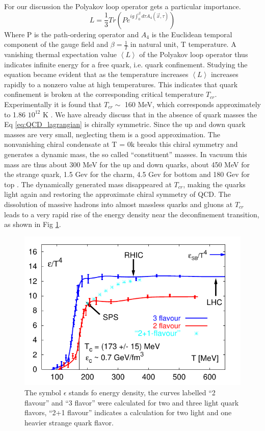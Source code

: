 \documentclass[12pt,a4paper]{book}
\begin{document}
	For our discussion the Polyakov loop operator gets a particular importance. 
	\begin{equation}
		L=\frac{1}{3} Tr \left(P e^{ig \int_{0}^{\beta} d\tau A_4(\vec{x},\tau) } \right)
		\label{eq:Polyakov-loop}
	\end{equation}
	Where P is the path-ordering operator and $A_4$ is the Euclidean temporal component of the gauge field and $\beta= \frac{1}{T}$ in natural unit, T temperature. A vanishing thermal expectation value $\left<L\right>$ of the Polyakov loop operator thus indicates infinite energy for a free quark, i.e. quark confinement. Studying the equation became evident that as the temperature increases $\left<L\right>$ increases rapidly to a nonzero value at high temperatures. This indicates that quark confinement is broken at the corresponding critical temperature $T_{cr}$. Experimentally it is found that $T_{cr} \sim$ 160 MeV, which corresponds approximately to 1.86 $10^12$ K \cite{Herrmann:2920632}. We have already discuss that in the absence of quark masses the Eq \ref{eq:QCD_lagrangian} is chirally symmetric. Since the up and down quark masses are very small, neglecting them is a good approximation. The nonvanishing chiral condensate at T = 0k breaks this chiral symmetry and generates a dynamic mass, the so called “constituent” masses. In vacuum this mass are thus about 300 MeV for the up and down quarks, about 450 MeV for the strange quark, 1.5 Gev for the charm, 4.5 Gev for bottom and 180 Gev for top \cite{Semprini}. The dynamically generated mass disappeared at $T_{cr}$, making the quarks light again and restoring the approximate chiral symmetry of QCD. The dissolution of massive hadrons into almost massless quarks and gluons at $T_{cr}$ leads to a very rapid rise of the energy density near the deconfinement transition, as shown in Fig \ref{fig:deconfinement}.
	\begin{figure}[ht]
		\centering
		\includegraphics[width=0.7\linewidth]{pictures/deconfinement.png}
		\caption{The symbol $\epsilon$ stands fo energy density, the curves labelled “2 flavour” and “3 flavor” were calculated for two and three light quark flavors, “2+1 flavour” indicates a calculation for two light and one heavier strange quark flavor.}
		\label{fig:deconfinement} 
	\end{figure}
\end{document}
